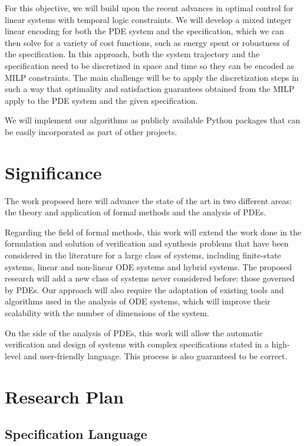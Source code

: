 \documentclass{article}
\begin{document}
For this objective, we will build upon the recent advances in optimal control
for linear systems with temporal logic constraints. We will develop a mixed
integer linear encoding for both the PDE system and the specification, which we can then solve
for a variety of cost functions, such as energy spent or robustness of the
specification. In this approach, both the system trajectory and the
specification need to be discretized in space and time so they can be encoded 
as MILP constraints.
The main challenge will be to apply the discretization steps in such a way that
optimality and satisfaction guarantees obtained from the MILP apply to the PDE
system and the given specification.

We will implement our algorithms as publicly available Python packages that can
be easily incorporated as part of other projects.

\section{Significance}
\label{sec:significance}

The work proposed here will advance the state of the art in two different areas:
the theory and application of formal methods and the analysis of PDEs.

Regarding the field of formal methods, this work will extend the work done in
the formulation and solution of
verification and synthesis problems that have been considered in the literature for a
large class of systems, including finite-state systems, linear and non-linear
ODE systems and hybrid systems. The proposed research will add a new class of
systems never considered before: those governed by PDEs. Our approach will also
require the adaptation of existing tools and algorithms used in the analysis of
ODE systems, which will improve their scalability with the number of dimensions
of the system.

On the side of the analysis of PDEs, this work will allow the automatic
verification and design of systems
with complex specifications stated in a high-level and user-friendly language.
This process is also guaranteed to be correct.

\section{Research Plan}
\label{sec:research_plan}

\subsection{Specification Language}
\label{sub:specification_language}
\end{document}
